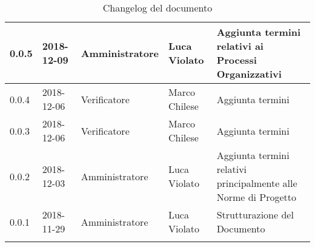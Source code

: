 \begin{center}
\begin{longtable}[c]{|m{}|m{}|m{}|m{}|p{}|}
\hline
0.0.5 & 2018-12-09 & Amministratore & Luca Violato & Aggiunta termini relativi ai Processi Organizzativi\\
\hline
\rowcolor{grigio}0.0.4 & 2018-12-06 & Verificatore & Marco Chilese & Aggiunta termini\\
\hline 
0.0.3 & 2018-12-06 & Verificatore  & Marco Chilese & Aggiunta termini\\
\hline
\rowcolor{grigio}0.0.2 & 2018-12-03 & Amministratore & Luca Violato & Aggiunta termini relativi principalmente alle Norme di Progetto \\
\hline
0.0.1 & 2018-11-29  & Amministratore & Luca Violato & Strutturazione del Documento \\
\hline
\caption{Changelog del documento}
\end{longtable}
\end{center}
